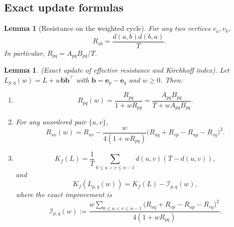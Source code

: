 \documentclass[11pt]{article}
\numberwithin{equation}{section}
\newtheorem{lemma}[theorem]{Lemma}
\theoremstyle{definition}
\theoremstyle{remark}
\begin{document}
\subsection{Exact update formulas}

\begin{lemma}[Resistance on the weighted cycle]\label{lem:Rab_cycle}
	For any two vertices $v_a,v_b$,
	\begin{equation}\label{eq:Rab_cycle}
		R_{ab}=\frac{d(a,b)d(b,a)}{T}.
	\end{equation}
	In particular, $R_{pq}=A_{pq}B_{pq}/T$.
\end{lemma}



\begin{lemma}\label{lem:res_kir_update}
	\emph{(Exact update of effective resistance and Kirchhoff index).}
	Let $L_{p,q}(w)=L+w\boldsymbol{b}\boldsymbol{b}^\top$ with $\boldsymbol{b}=\boldsymbol{e}_p-\boldsymbol{e}_q$ and $w\ge0$.
	Then:
	\begin{enumerate}
		\item[\textnormal{(i)}]
		\begin{equation}\label{eq:Rpq_update_cycle}
			R_{pq}(w)=\frac{R_{pq}}{1+wR_{pq}}
			=\frac{A_{pq}B_{pq}}{T+wA_{pq}B_{pq}}.
		\end{equation}
		\item[\textnormal{(ii)}] For any unordered pair $\{u,v\}$,
		\begin{equation}\label{eq:Ruv_update_cycle_compact}
			R_{uv}(w)=R_{uv}-\frac{w}{4(1+wR_{pq})}
			\bigl(R_{uq}+R_{vp}-R_{up}-R_{vq}\bigr)^2.
		\end{equation}
		\item[\textnormal{(iii)}]
		\begin{equation}\label{eq:Kf_cycle_sum}
			K_f(L)=\frac1T\sum_{0\le u<v\le n-1}d(u,v)(T-d(u,v)),
		\end{equation}
		and
		\begin{equation}\label{eq:Kf_update_cycle_compact}
			K_f(L_{p,q}(w))
			=K_f(L)-\mathcal I_{p,q}(w),
		\end{equation}
		where the exact improvement is
		\begin{equation}\label{eq:Kf_improvement_full}
			\mathcal I_{p,q}(w):=
			\frac{w\sum_{0\le u<v\le n-1}
				\bigl(R_{uq}+R_{vp}-R_{up}-R_{vq}\bigr)^2}{4(1+wR_{pq})}.
		\end{equation}
	\end{enumerate}
\end{lemma}
\end{document}
